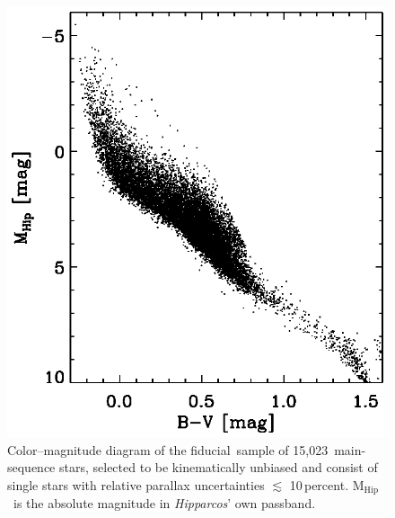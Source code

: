 \documentclass[12pt,preprint]{aastex}
\newcommand{\Hipparcos}{\textsl{Hipparcos}}
\newcommand{\mhip}{\ensuremath{\mathrm{M}_{\mathrm{Hip}}}}
\newcommand{\nstars}{15,023}
\newcommand{\fiducial}{fiducial}
\begin{document}
\clearpage
\begin{figure}
\includegraphics[]{cmd.ps}
\caption{Color--magnitude diagram of the \fiducial\ sample of \nstars\
main-sequence stars, selected to be kinematically unbiased and
consist of single stars with relative parallax uncertainties
$\lesssim$ 10\,percent. \mhip\ is the absolute magnitude in
\Hipparcos' own passband. }\label{fig:cmd}
\end{figure}
\end{document}
